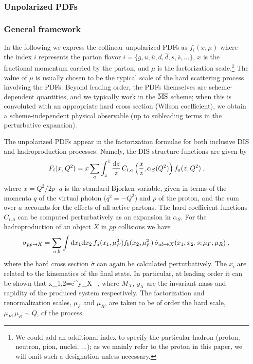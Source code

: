 \subsubsection{Unpolarized PDFs}

\subsubsection*{General framework}

In the following we express the collinear unpolarized PDFs as $f_{i}(x,\mu)$
where the index $i$ represents the parton flavor $i=\{g,u,\bar{u},d,\bar{d},s,\bar{s},...\}$,
$x$ is the fractional momentum carried by the parton, and $\mu$
is the factorization  scale.\footnote{We could add an additional index to specify the particular hadron
(proton, neutron, pion, nuclei, ...); as we mainly refer to the proton
  in this paper, we will omit such a designation unless necessary.}
%
The value of $\mu$ is usually chosen to be the typical scale of the hard scattering
process involving the PDFs.
%
Beyond leading order, the PDFs themselves
are scheme-dependent quantities, and we typically work in
the $\overline{\rm MS}$ scheme; when this is convoluted with an appropriate
hard cross section (Wilson coefficient), we obtain a scheme-independent
physical observable (up to subleading terms in the perturbative expansion). 

The unpolarized PDFs appear in the factorization formulae for both inclusive DIS and hadroproduction processes. Namely, the DIS structure functions are given by
\begin{equation}
F_i(x,Q^2)=x\sum_a \int_x^1 \frac{{\rm d}z}{z}\,C_{i,a}\left(\frac{x}{z},\alpha_S(Q^2)\right)f_a(z,Q^2)\, ,
\end{equation}
where $x=Q^2/2p\cdot q$ is the standard Bjorken variable, given in terms of the momenta $q$ of the virtual photon ($q^2=-Q^2$) and $p$ of the proton,
and the sum over $a$ accounts for the effects of all active partons.
%
The hard coefficient functions $C_{i,a}$ can be computed perturbatively as an expansion in $\alpha_S$.
%
For the hadroproduction of an object $X$ in $pp$ collisions we have
\begin{equation}
  \label{eq:LHCxsec}
\sigma_{pp\to X}=\sum_{a,b}\int {\rm d}x_1 {\rm d}x_2\, f_a(x_1,\mu_F^2)f_b(x_2,\mu_F^2)\,\hat{\sigma}_{ab\to X}(x_1,x_2,s;\mu_{F},\mu_R)\;,
\end{equation}
where the hard cross section $\hat{\sigma}$ can again be calculated perturbatively. The $x_i$ are related to the kinematics of the final state.
%
In particular, at leading order it can be shown that
\be
x_{1,2}=e^{\pm y_X} \, ,
\ee
where $M_X$, $y_X$ are the invariant mass and rapidity of the produced system respectively.
%
The factorization and renormalization scales, $\mu_F$ and $\mu_R$, are taken to be of order the hard scale, $\mu_F,\mu_R
\sim Q$, of the process.

